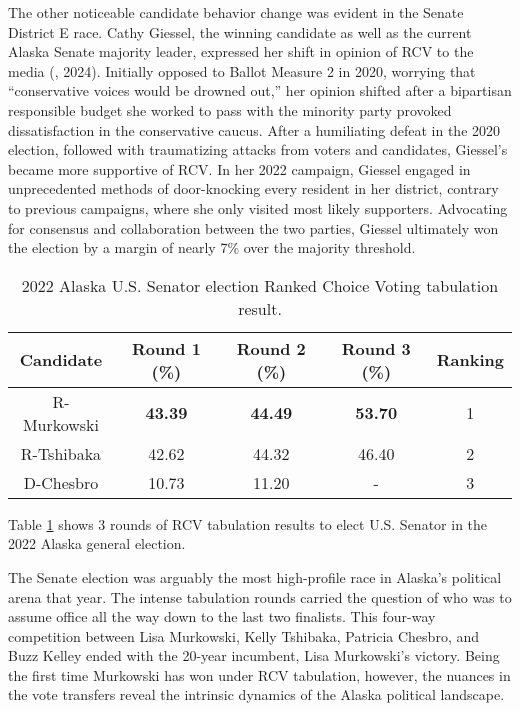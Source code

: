 The other noticeable candidate behavior change was evident in the Senate District E race. Cathy Giessel, the winning candidate as well as the current Alaska Senate majority leader, expressed her shift in opinion of RCV to the media (\cite{troiano2024}, 2024). Initially opposed to Ballot Measure 2 in 2020, worrying that “conservative voices would be drowned out,” her opinion shifted after a bipartisan responsible budget she worked to pass with the minority party provoked dissatisfaction in the conservative caucus. After a humiliating defeat in the 2020 election, followed with traumatizing attacks from voters and candidates, Giessel’s became more supportive of RCV. In her 2022 campaign, Giessel engaged in unprecedented methods of door-knocking every resident in her district, contrary to previous campaigns, where she only visited most likely supporters. Advocating for consensus and collaboration between the two parties, Giessel ultimately won the election by a margin of nearly 7\% over the majority threshold. 

\begin{table}[h]
\centering
\begin{tabular}{|c|c|c|c|c|}
\hline
Candidate & Round 1 (\%) & Round 2 (\%) & Round 3 (\%) & Ranking \\ \hline 
R-Murkowski & \textbf{43.39} & \textbf{44.49} & \textbf{53.70} & 1 \\ \hline
R-Tshibaka & 42.62 & 44.32 & 46.40 & 2 \\ \hline
D-Chesbro & 10.73 & 11.20 & - & 3 \\ \hline
\end{tabular}
\caption{2022 Alaska U.S. Senator election Ranked Choice Voting tabulation result.}
\label{tab:4}
\end{table}

Table \ref{tab:4} shows 3 rounds of RCV tabulation results to elect U.S. Senator in the 2022 Alaska general election.

The Senate election was arguably the most high-profile race in Alaska’s political arena that year. The intense tabulation rounds carried the question of who was to assume office all the way down to the last two finalists. This four-way competition between Lisa Murkowski, Kelly Tshibaka, Patricia Chesbro, and Buzz Kelley ended with the 20-year incumbent, Lisa Murkowski’s victory. Being the first time Murkowski has won under RCV tabulation, however, the nuances in the vote transfers reveal the intrinsic dynamics of the Alaska political landscape. 

